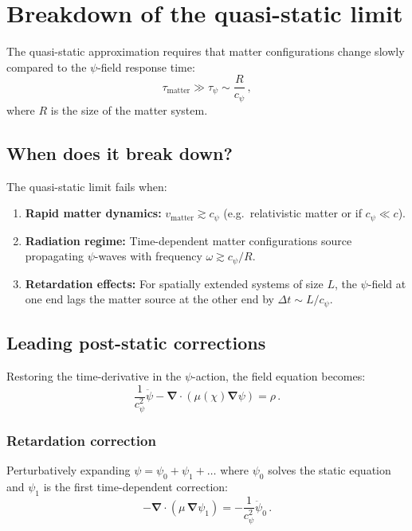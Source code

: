 \documentclass[12pt,a4paper]{article}
\theoremstyle{definition}
\theoremstyle{remark}
\newcommand{\grad}{\boldsymbol{\nabla}}
\begin{document}
\section{Breakdown of the quasi-static limit}
\label{sec:post_static}

The quasi-static approximation requires that matter configurations change
slowly compared to the $\psi$-field response time:
\begin{equation}
\tau_{\mathrm{matter}} \gg \tau_\psi \sim \frac{R}{c_\psi}\,,
\end{equation}
where $R$ is the size of the matter system.

\subsection{When does it break down?}

The quasi-static limit fails when:
\begin{enumerate}
\item \textbf{Rapid matter dynamics:} $v_{\mathrm{matter}} \gtrsim c_\psi$
(e.g.\ relativistic matter or if $c_\psi \ll c$).
\item \textbf{Radiation regime:} Time-dependent matter configurations
source propagating $\psi$-waves with frequency $\omega \gtrsim c_\psi/R$.
\item \textbf{Retardation effects:} For spatially extended systems of size $L$,
the $\psi$-field at one end lags the matter source at the other end by
$\Delta t \sim L/c_\psi$.
\end{enumerate}

\subsection{Leading post-static corrections}

Restoring the time-derivative in the $\psi$-action, the field equation becomes:
\begin{equation}
\frac{1}{c_\psi^2}\ddot{\psi} - \grad\cdot(\mu(\chi)\grad\psi) = \rho\,.
\end{equation}

\subsubsection{Retardation correction}

Perturbatively expanding $\psi = \psi_0 + \psi_1 + \ldots$ where $\psi_0$
solves the static equation and $\psi_1$ is the first time-dependent correction:
\begin{equation}
-\grad\cdot(\mu\,\grad\psi_1) = -\frac{1}{c_\psi^2}\ddot{\psi}_0\,.
\end{equation}
\end{document}
